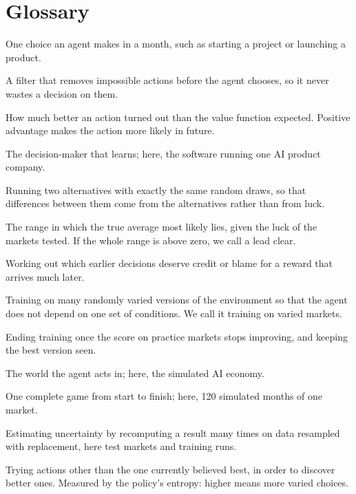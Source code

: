 \documentclass[11pt]{article}
\begin{document}



\appendix
\section{Glossary}
\label{app:glossary}

\begin{description}[style=unboxed, leftmargin=0pt, itemsep=3pt]
\small
\item[Action.] One choice an agent makes in a month, such as starting a project or launching a product.
\item[Action mask.] A filter that removes impossible actions before the agent chooses, so it never wastes a decision on them.
\item[Advantage.] How much better an action turned out than the value function expected. Positive advantage makes the action more likely in future.
\item[Agent.] The decision-maker that learns; here, the software running one AI product company.
\item[Common random numbers.] Running two alternatives with exactly the same random draws, so that differences between them come from the alternatives rather than from luck.
\item[Confidence interval (95\%).] The range in which the true average most likely lies, given the luck of the markets tested. If the whole range is above zero, we call a lead clear.
\item[Credit-assignment problem.] Working out which earlier decisions deserve credit or blame for a reward that arrives much later.
\item[Domain randomisation.] Training on many randomly varied versions of the environment so that the agent does not depend on one set of conditions. We call it training on varied markets.
\item[Early stopping.] Ending training once the score on practice markets stops improving, and keeping the best version seen.
\item[Environment.] The world the agent acts in; here, the simulated AI economy.
\item[Episode.] One complete game from start to finish; here, 120 simulated months of one market.
\item[Bootstrap.] Estimating uncertainty by recomputing a result many times on data resampled with replacement, here test markets and training runs.
\item[Exploration.] Trying actions other than the one currently believed best, in order to discover better ones. Measured by the policy's entropy: higher means more varied choices.

\end{description}
\end{document}
